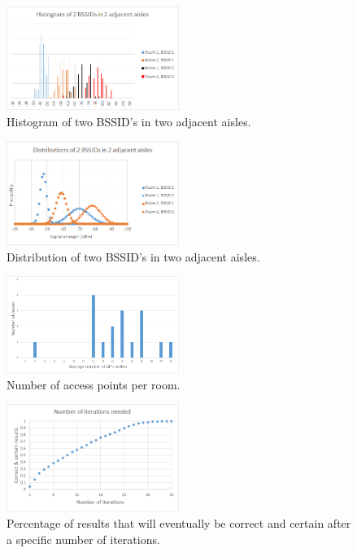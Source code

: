 \documentclass[a4paper,10pt,twoside]{IEEEtran}
\begin{document}
\begin{figure}[h!]
  \centering
    \includegraphics[width=0.5\textwidth]{histogram}
    \caption{Histogram of two BSSID's in two adjacent aisles.}
    \label{fig:histogram}
\end{figure}

\begin{figure}[h!]
  \centering
    \includegraphics[width=0.5\textwidth]{distribution}
    \caption{Distribution of two BSSID's in two adjacent aisles.}
    \label{fig:distribution}
\end{figure}

\begin{figure}[h!]
  \centering
    \includegraphics[width=0.5\textwidth]{graph-numberAPperRoom}
    \caption{Number of access points per room.}
    \label{fig:graph-numberAPperRoom}
\end{figure}

\begin{figure}[h!]
  \centering
    \includegraphics[width=0.5\textwidth]{iterations_needed}
    \caption{Percentage of results that will eventually be correct and certain after a specific number of iterations.}
    \label{fig:iterations-needed}
\end{figure}
\end{document}
